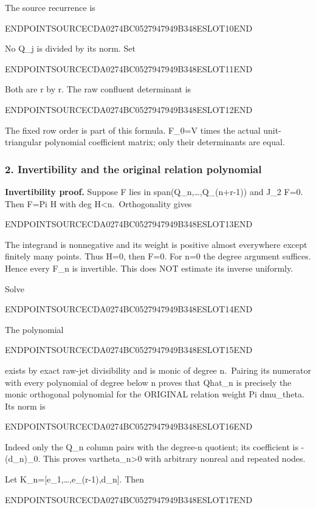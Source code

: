 The source recurrence is

ENDPOINTSOURCECDA0274BC0527947949B348ESLOT10END

No Q\_j is divided by its norm. Set

ENDPOINTSOURCECDA0274BC0527947949B348ESLOT11END

Both are r by r. The raw confluent determinant is

ENDPOINTSOURCECDA0274BC0527947949B348ESLOT12END

The fixed row order is part of this formula. F\_0=V times the actual unit-triangular polynomial coefficient matrix; only their determinants are equal.

\subsubsection{2. Invertibility and the original relation polynomial}\label{endpoint-pr24_original--invertibility-and-the-original-relation-polynomial}

\textbf{Invertibility proof.} Suppose F lies in span(Q\_n,\ldots,Q\_(n+r-1)) and J\_2 F=0. Then F=Pi H with deg H\textless n.~Orthogonality gives

ENDPOINTSOURCECDA0274BC0527947949B348ESLOT13END

The integrand is nonnegative and its weight is positive almost everywhere except finitely many points. Thus H=0, then F=0. For n=0 the degree argument suffices. Hence every F\_n is invertible. This does NOT estimate its inverse uniformly.

Solve

ENDPOINTSOURCECDA0274BC0527947949B348ESLOT14END

The polynomial

ENDPOINTSOURCECDA0274BC0527947949B348ESLOT15END

exists by exact raw-jet divisibility and is monic of degree n.~Pairing its numerator with every polynomial of degree below n proves that Qhat\_n is precisely the monic orthogonal polynomial for the ORIGINAL relation weight Pi dmu\_theta. Its norm is

ENDPOINTSOURCECDA0274BC0527947949B348ESLOT16END

Indeed only the Q\_n column pairs with the degree-n quotient; its coefficient is -(d\_n)\_0. This proves vartheta\_n\textgreater0 with arbitrary nonreal and repeated nodes.

Let K\_n={[}e\_1,\ldots,e\_(r-1),d\_n{]}. Then

ENDPOINTSOURCECDA0274BC0527947949B348ESLOT17END

